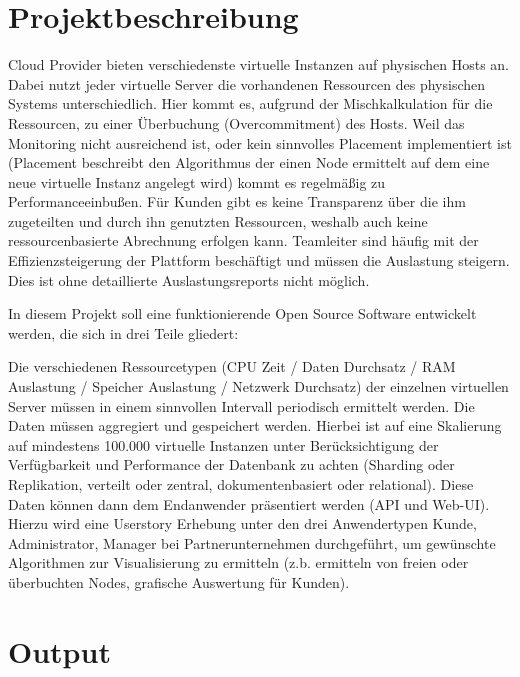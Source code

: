 \section{Projektbeschreibung}

Cloud Provider bieten verschiedenste virtuelle Instanzen auf physischen Hosts
an. Dabei nutzt jeder virtuelle Server die vorhandenen Ressourcen des
physischen Systems unterschiedlich. Hier kommt es, aufgrund der
Mischkalkulation für die Ressourcen, zu einer Überbuchung (Overcommitment) des
Hosts. Weil das Monitoring nicht ausreichend ist, oder kein sinnvolles
Placement implementiert ist (Placement beschreibt den Algorithmus der einen
Node ermittelt auf dem eine neue virtuelle Instanz angelegt wird) kommt es
regelmäßig zu Performanceeinbußen. Für Kunden gibt es keine Transparenz über
die ihm zugeteilten und durch ihn genutzten Ressourcen, weshalb auch keine
ressourcenbasierte Abrechnung erfolgen kann. Teamleiter sind häufig mit der
Effizienzsteigerung der Plattform beschäftigt und müssen die Auslastung
steigern. Dies ist ohne detaillierte Auslastungsreports nicht möglich.

In diesem Projekt soll eine funktionierende Open Source Software entwickelt
werden, die sich in drei Teile gliedert:
\begin{outline}
    \1 Die verschiedenen Ressourcetypen (CPU Zeit / Daten Durchsatz / RAM
       Auslastung / Speicher Auslastung / Netzwerk Durchsatz) der einzelnen
       virtuellen Server müssen in einem sinnvollen Intervall periodisch ermittelt
       werden.
    \1 Die Daten müssen aggregiert und gespeichert werden. Hierbei ist auf eine
       Skalierung auf mindestens 100.000 virtuelle Instanzen unter Berücksichtigung
       der Verfügbarkeit und Performance der Datenbank zu achten (Sharding oder
       Replikation, verteilt oder zentral, dokumentenbasiert oder relational).
    \1 Diese Daten können dann dem Endanwender präsentiert werden (API und
       Web-UI). Hierzu wird eine Userstory Erhebung unter den drei Anwendertypen
       Kunde, Administrator, Manager bei Partnerunternehmen durchgeführt, um
       gewünschte Algorithmen zur Visualisierung zu ermitteln (z.b. ermitteln von
       freien oder überbuchten Nodes, grafische Auswertung für Kunden).
\end{outline}

\section{Output}

